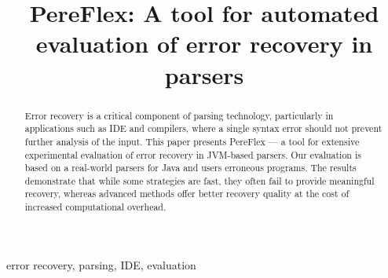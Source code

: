 \documentclass[conference]{IEEEtran}
\begin{document}
\title{PereFlex: A tool for automated evaluation of error recovery in parsers\\
}

\author{
\and
{}
\and
{}

\linebreakand{}
\and
{}
\and
{}
}
\maketitle

\begin{abstract}

Error recovery is a critical component of parsing technology, particularly in applications such as IDE and compilers, where a single syntax error should not prevent further analysis of the input. This paper presents PereFlex --- a tool for extensive experimental evaluation of error recovery in JVM-based parsers. Our evaluation is based on a real-world parsers for Java and users erroneous programs. The results demonstrate that while some strategies are fast, they often fail to provide meaningful recovery, whereas advanced methods offer better recovery quality at the cost of increased computational overhead.

\end{abstract}

\begin{IEEEkeywords}
error recovery, parsing, IDE, evaluation
\end{IEEEkeywords}
\end{document}
